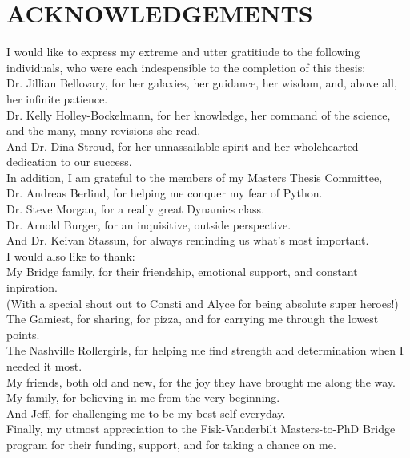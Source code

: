 \documentclass[12pt,headA,chapB]{fiskthesis}
\begin{document}
\chapter*{ACKNOWLEDGEMENTS}
\thispagestyle{empty}
I would like to express my extreme and utter gratitiude to the following individuals, who were each indespensible to the completion of this thesis:\\
	Dr. Jillian Bellovary, for her galaxies, her guidance, her wisdom, and, above all, her infinite patience.\\
	Dr. Kelly Holley-Bockelmann, for her knowledge, her command of the science, and the many, many revisions she read.\\
	And Dr. Dina Stroud, for her unnassailable spirit and her wholehearted dedication to our success.\\

In addition, I am grateful to the members of my Masters Thesis Committee, \\
    Dr. Andreas Berlind, for helping me conquer my fear of Python.\\
    Dr. Steve Morgan, for a really great Dynamics class.\\
    Dr. Arnold Burger, for an inquisitive, outside perspective.\\
    And Dr. Keivan Stassun, for always reminding us what's most important.\\

I would also like to thank:\\
	My Bridge family, for their friendship, emotional support, and constant inpiration.\\
	(With a special shout out to Consti and Alyce for being absolute super heroes!)\\
	The Gamiest, for sharing, for pizza, and for carrying me through the lowest points.\\
	The Nashville Rollergirls, for helping me find strength and determination when I needed it most.\\
	My friends, both old and new, for the joy they have brought me along the way.\\
	My family, for believing in me from the very beginning.\\
	And Jeff, for challenging me to be my best self everyday.\\

Finally, my utmost appreciation to the Fisk-Vanderbilt Masters-to-PhD Bridge program for their funding, support, and for taking a chance on me.


\renewcommand{\thepage}{}\renewcommand{\thepage}{}

\end{document}

